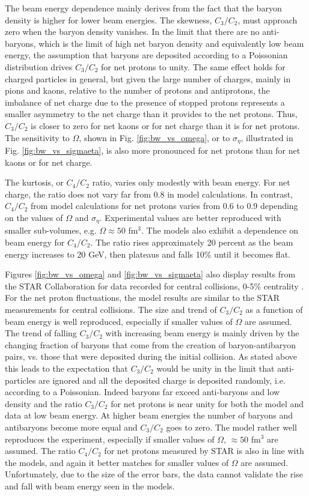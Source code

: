 The beam energy dependence mainly derives from the fact that the baryon density is higher for lower beam energies. The skewness, $C_3/C_2$, must approach zero when the baryon density vanishes. In the limit that there are no anti-baryons, which is the limit of high net baryon density and equivalently low beam energy, the assumption that baryons are deposited according to a Poissonian distribution drives $C_3/C_2$ for net protons to unity. The same effect holds for charged particles in general, but given the large number of charges, mainly in pions and kaons, relative to the number of protons and antiprotons, the imbalance of net charge due to the presence of stopped protons represents a smaller asymmetry to the net charge than it provides to the net protons. Thus, $C_3/C_2$ is closer to zero for net kaons or for net charge than it is for net protons. The sensitivity to $\Omega$, shown in Fig. \ref{fig:bw_vs_omega}, or to $\sigma_\eta$, illustrated in Fig. \ref{fig:bw_vs_sigmaeta}, is also more pronounced for net protons than for net kaons or for net charge.

The kurtosis, or $C_4/C_2$ ratio, varies only modestly with beam energy. For net charge, the ratio does not vary far from 0.8 in model calculations. In contrast, $C_4/C_2$ from model calculations for net protons varies from 0.6 to 0.9 depending on the values of $\Omega$ and $\sigma_\eta$. Experimental values are better reproduced with smaller sub-volumes, e.g. $\Omega\approx 50$ fm$^3$. The models also exhibit a dependence on beam energy for $C_4/C_2$. The ratio rises approximately 20 percent as the beam energy increases to 20 GeV, then plateaus and falls 10\% until it becomes flat.

Figures \ref{fig:bw_vs_omega} and \ref{fig:bw_vs_sigmaeta} also display results from the STAR Collaboration for data recorded for central collisions, 0-5\% centrality \cite{Adamczyk:2014fia,Adam:2020unf,Adamczyk:2017wsl}. For the net proton fluctuations, the model results are similar to the STAR measurements for central collisions. The size and trend of $C_3/C_2$ as a function of beam energy is well reproduced, especially if smaller values of $\Omega$ are assumed. The trend of falling $C_3/C_2$ with increasing beam energy is mainly driven by the changing fraction of baryons that come from the creation of baryon-antibaryon pairs, vs. those that were deposited during the initial collision. As stated above this leads to the expectation that $C_3/C_2$ would be unity in the limit that anti-particles are ignored and all the deposited charge is deposited randomly, i.e. according to a Poissonian. Indeed baryons far exceed anti-baryons and low density and the ratio $C_3/C_2$ for net protons is near unity for both the model and data at low beam energy. At higher beam energies the number of baryons and antibaryons become more equal and $C_3/C_2$ goes to zero. The model rather well reproduces the experiment, especially if smaller values of $\Omega$, $\approx 50$ fm$^3$ are assumed. The ratio $C_4/C_2$ for net protons measured by STAR is also in line with the models, and again it better matches for smaller values of $\Omega$ are assumed. Unfortunately, due to the size of the error bars, the data cannot validate the rise and fall with beam energy seen in the models. 

